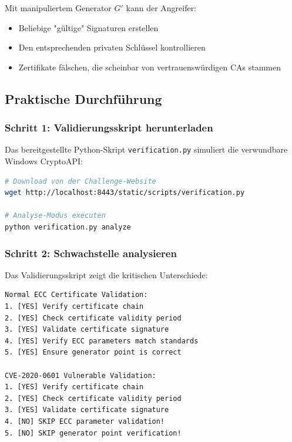 \documentclass{article}
\begin{document}
Mit manipuliertem Generator $G'$ kann der Angreifer:
\begin{itemize}
    \item Beliebige "gültige" Signaturen erstellen
    \item Den entsprechenden privaten Schlüssel kontrollieren
    \item Zertifikate fälschen, die scheinbar von vertrauenswürdigen CAs stammen
\end{itemize}

\subsection{Praktische Durchführung}

\subsubsection{Schritt 1: Validierungsskript herunterladen}

Das bereitgestellte Python-Skript \texttt{verification.py} simuliert die verwundbare Windows CryptoAPI:

\begin{lstlisting}[language=bash, caption=Skript-Download]
# Download von der Challenge-Website
wget http://localhost:8443/static/scripts/verification.py

# Analyse-Modus executen
python verification.py analyze
\end{lstlisting}

\subsubsection{Schritt 2: Schwachstelle analysieren}

Das Validierungsskript zeigt die kritischen Unterschiede:

\begin{lstlisting}[caption=Vulnerable vs. Secure Validation]
Normal ECC Certificate Validation:
1. [YES] Verify certificate chain
2. [YES] Check certificate validity period
3. [YES] Validate certificate signature
4. [YES] Verify ECC parameters match standards
5. [YES] Ensure generator point is correct

CVE-2020-0601 Vulnerable Validation:
1. [YES] Verify certificate chain
2. [YES] Check certificate validity period
3. [YES] Validate certificate signature
4. [NO] SKIP ECC parameter validation!
5. [NO] SKIP generator point verification!
\end{lstlisting}
\end{document}
